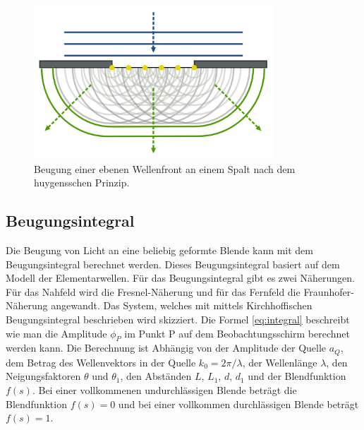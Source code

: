 \begin{figure}[h!]
	\centering
	\includegraphics[width=0.8\textwidth]{data/hspalt.png}
	\caption{Beugung einer ebenen Wellenfront an einem Spalt nach dem huygensschen Prinzip.}
	\label{fig:heygens_spalt}
\end{figure}





\newpage
\subsection{Beugungsintegral}
Die Beugung von Licht an eine beliebig geformte Blende kann mit dem Beugungsintegral berechnet werden. Dieses Beugungsintegral basiert auf dem Modell der Elementarwellen. Für das Beugungsintegral gibt es zwei Näherungen. Für das Nahfeld wird die Fresnel-Näherung und für das Fernfeld die Fraunhofer-Näherung angewandt. Das System, welches mit mittels Kirchhoffischen Beugungsintegral beschrieben wird skizziert. Die Formel \ref{eq:integral} beschreibt wie man die Amplitude $ \phi_{P} $ im Punkt P auf dem Beobachtungsschirm berechnet werden kann. Die Berechnung ist Abhängig von der Amplitude der Quelle $ a_{Q} $, dem Betrag des Wellenvektors in der Quelle $ k_{0} = 2 \pi/\lambda $, der Wellenlänge $ \lambda $, den Neigungsfaktoren $ \theta $ und $ \theta_{1} $, den Abständen $ L $, $ L_{1} $, $ d $, $ d_{1} $ und der Blendfunktion $ f(s) $. Bei einer vollkommenen undurchlässigen Blende beträgt die Blendfunktion $ f(s)=0 $ und bei einer vollkommen durchlässigen Blende beträgt $ f(s)=1 $.

